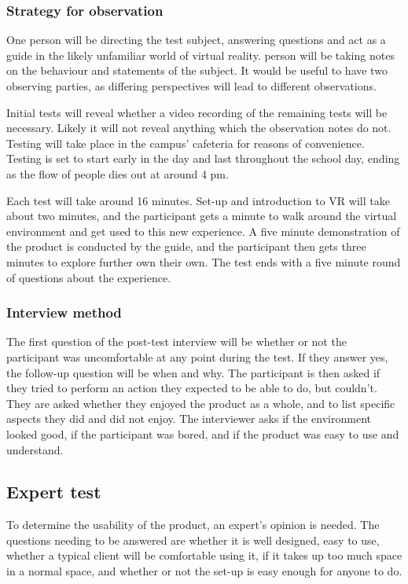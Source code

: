 \subsubsection{Strategy for observation}

One person will be directing the test subject, answering questions and act as a guide in the likely unfamiliar world of virtual reality.   person will be taking notes on the behaviour and statements of the subject. It would be useful to have two observing parties, as differing perspectives will lead to different observations. 

Initial tests will reveal whether a video recording of the remaining tests will be necessary. Likely it will not reveal anything which the observation notes do not. Testing will take place in the campus' cafeteria for reasons of convenience. Testing is set to start early in the day and last throughout the school day, ending as the flow of people dies out at around 4 pm.

Each test will take around 16 minutes. Set-up and introduction to VR will take about two minutes, and the participant gets a minute to walk around the virtual environment and get used to this new experience. A five minute demonstration of the product is conducted by the guide, and the participant then gets three minutes to explore further own their own. The test ends with a five minute round of questions about the experience. 



\subsubsection{Interview method}
The first question of the post-test interview will be whether or not the participant was uncomfortable at any point during the test. If they answer yes, the follow-up question will be when and why.
The participant is then asked if they tried to perform an action they expected to be able to do, but couldn't. They are asked whether they enjoyed the product as a whole, and to list specific aspects they did and did not enjoy. The interviewer asks if the environment looked good, if the participant was bored, and if the product was easy to use and understand. 

\subsection{Expert test}
To determine the usability of the product, an expert's opinion is needed. The questions needing to be answered are whether it is well designed, easy to use, whether a typical client will be comfortable using it, if it takes up too much space in a normal space, and whether or not the set-up is easy enough for anyone to do.
